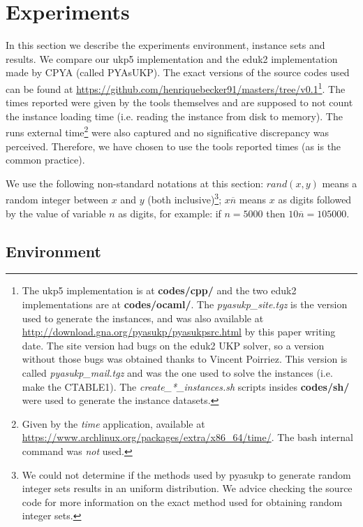 \documentclass[runningheads,a4paper]{llncs}
\begin{document}
\section{Experiments}
In this section we describe the experiments environment, instance sets and results. We compare our ukp5 implementation and the eduk2 implementation made by CPYA (called PYAsUKP). The exact versions of the source codes used can be found at \url{https://github.com/henriquebecker91/masters/tree/v0.1}\footnote{The ukp5 implementation is at \textbf{codes/cpp/} and the two eduk2 implementations are at \textbf{codes/ocaml/}. The \emph{pyasukp\_site.tgz} is the version used to generate the instances, and was also available at \url{http://download.gna.org/pyasukp/pyasukpsrc.html} by this paper writing date. The site version had bugs on the eduk2 UKP solver, so a version without those bugs was obtained thanks to Vincent Poirriez. This version is called \emph{pyasukp\_mail.tgz} and was the one used to solve the instances (i.e. make the CTABLE1). The \emph{create\_*\_instances.sh} scripts insides \textbf{codes/sh/} were used to generate the instance datasets.}. The times reported were given by the tools themselves and are supposed to not count the instance loading time (i.e. reading the instance from disk to memory). The runs external time\footnote{Given by the \textit{time} application, available at \url{https://www.archlinux.org/packages/extra/x86_64/time/}. The bash internal command was \emph{not} used.} were also captured and no significative discrepancy was perceived. Therefore, we have chosen to use the tools reported times (as is the common practice).

We use the following non-standard notations at this section: \(rand(x, y)\) means a random integer between \(x\) and \(y\) (both inclusive)\footnote{We could not determine if the methods used by pyasukp to generate random integer sets results in an uniform distribution. We advice checking the source code for more information on the exact method used for obtaining random integer sets.}; \(x\overline{n}\) means \(x\) as digits followed by the value of variable \(n\) as digits, for example: if \(n = 5000\) then \(10\overline{n} = 105000\).

\subsection{Environment}
\end{document}
